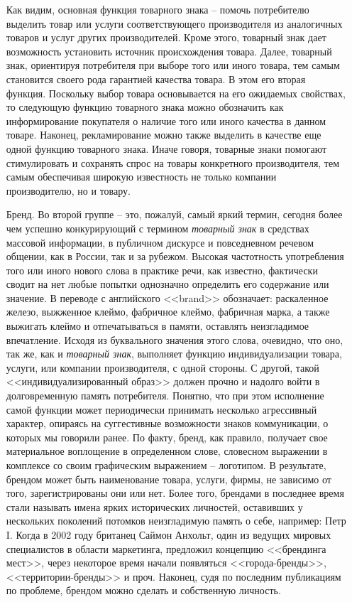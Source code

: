 \begin{itemize}
  Как видим, основная функция товарного знака -- помочь потребителю выделить
  товар или услуги соответствующего производителя из аналогичных товаров и услуг
  других производителей. Кроме этого, товарный знак дает возможность установить
  источник происхождения товара. Далее, товарный знак, ориентируя потребителя
  при выборе того или иного товара, тем самым становится своего рода гарантией
  качества товара. В этом его вторая функция. Поскольку выбор товара основывается
  на его ожидаемых свойствах, то следующую функцию товарного знака можно обозначить
  как информирование покупателя о наличие того или иного качества в данном товаре.
  Наконец, рекламирование можно также выделить в качестве еще одной функцию
  товарного знака. Иначе говоря, товарные знаки помогают стимулировать и
  сохранять спрос на товары конкретного производителя, тем самым обеспечивая
  широкую известность не только компании производителю, но и товару.

\item[Бренд.] Во второй группе -- это, пожалуй, самый яркий термин,
  сегодня более чем успешно конкурирующий с термином \emph{товарный знак} в
  средствах массовой информации, в публичном дискурсе и повседневном речевом
  общении, как в России, так и за рубежом. Высокая частотность употребления
  того или иного нового слова в практике речи, как известно, фактически
  сводит на нет любые попытки однозначно определить его содержание или значение.
  В переводе с английского <<brand>> обозначает: раскаленное железо, выжженное
  клеймо, фабричное клеймо, фабричная марка, а также выжигать клеймо и
  отпечатываться в памяти, оставлять неизгладимое впечатление.\autocite{oxford_dictionary}
  Исходя из буквального значения этого слова, очевидно, что оно,
  так же, как и \emph{товарный знак}, выполняет функцию индивидуализации товара,
  услуги, или компании производителя, с одной стороны. С другой, такой
  <<индивидуализированный образ>> должен прочно и надолго войти в долговременную
  память потребителя. Понятно, что при этом исполнение самой функции может
  периодически принимать несколько агрессивный характер, опираясь на
  суггестивные возможности знаков коммуникации, о которых мы говорили ранее.
  По факту, бренд, как правило, получает свое материальное воплощение
  в определенном слове, словесном выражении в комплексе со своим
  графическим выражением -- логотипом. В результате, брендом может быть
  наименование товара, услуги, фирмы, не зависимо от того, зарегистрированы
  они или нет. Более того, брендами в последнее время стали называть имена
  ярких исторических личностей, оставивших у нескольких поколений потомков
  неизгладимую память о себе, например: Петр I. Когда в 2002 году британец
  Саймон Анхольт, один из ведущих мировых специалистов в области маркетинга,
  предложил концепцию <<брендинга мест>>, через некоторое время начали
  появляться <<города-бренды>>, <<территории-бренды>>  и
  проч.\autocite{brending} Наконец, судя по последним публикациям по проблеме,
  брендом можно сделать и собственную личность.
  \autocite{peters1999brand}\autocite{schawbel2009me}\autocite{deckers2012branding}


\end{itemize}
